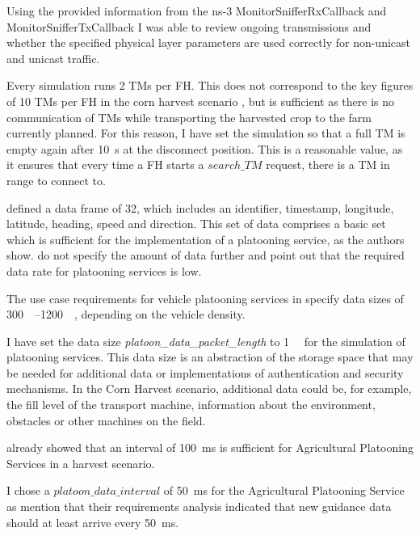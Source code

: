 Using the provided information from the ns-3 MonitorSnifferRxCallback and MonitorSnifferTxCallback I was able to review ongoing transmissions and
whether the specified physical layer parameters are used correctly for non-unicast and unicast traffic.

Every simulation runs \num{2} \ac{TM}s per \ac{FH}.
This does not correspond to the key figures of 10 \ac{TM}s per \ac{FH} in the corn harvest scenario \cite{faustzahlen2018},
but is sufficient as there is no communication of \ac{TM}s while transporting the harvested crop to the farm currently planned.
For this reason, I have set the simulation so that a full \ac{TM} is empty again after \SI{10}{\second} at the disconnect position.
This is a reasonable value, as it ensures that every time a \ac{FH} starts a $search\_TM$ request, there is a \ac{TM} in range to connect to.

\textcite{zhang_method_2009} defined a data frame of \SI{32}{\byte}, which includes an identifier, timestamp, longitude,
latitude, heading, speed and direction.
This set of data comprises a basic set which is sufficient for the implementation of a platooning service,
as the authors show.
\textcite{schlingmann_aef_2019} do not specify the amount of data further and point out that the required data rate
for platooning services is low.

The use case requirements for vehicle platooning services in \cite{TR-22.886} specify data sizes of \SIrange{300}{1200}{\kilo\byte},
depending on the vehicle density.

I have set the data size \textit{platoon\_data\_packet\_length} to \SI{1}{\kilo\byte} for the simulation of platooning services.
This data size is an abstraction of the storage space that may be needed for additional data or implementations
of authentication and security mechanisms.
In the Corn Harvest scenario, additional data could be, for example, the fill level of the transport machine,
information about the environment, obstacles or other machines on the field.

\textcite{zhang_method_2009} already showed that an interval of \SI{100}{\milli\second} is sufficient for Agricultural Platooning Services
in a harvest scenario.

I chose a $platoon\_data\_interval$ of \SI{50}{\milli\second} for the Agricultural Platooning Service
as \textcite{smolnik_5g_2020} mention that their requirements analysis indicated that new guidance data should at least arrive every \SI{50}{\milli\second}.

